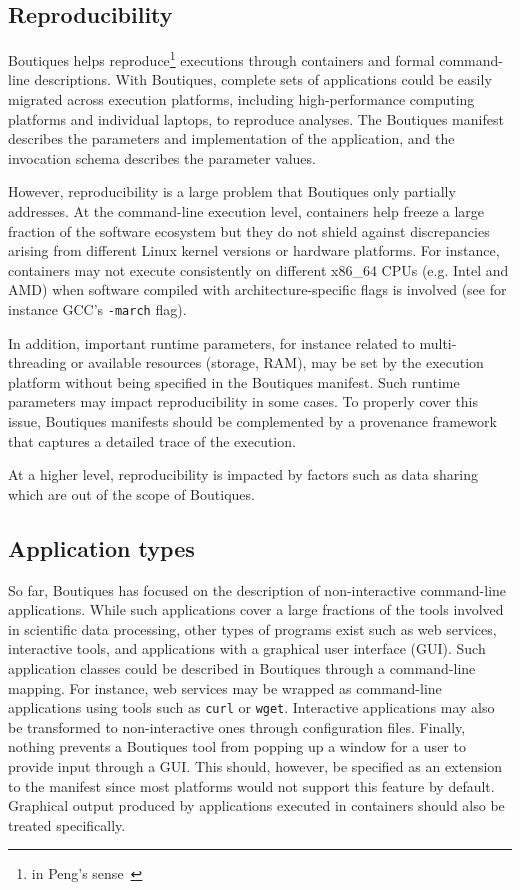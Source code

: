 \documentclass{article}
\newcommand{\boutiques}{Boutiques\xspace}
\begin{document}
\subsection{Reproducibility}

\boutiques helps reproduce\footnote{in Peng's
  sense~\cite{peng2011reproducible}} executions through containers and
formal command-line descriptions. With \boutiques, complete sets of
applications could be easily migrated across execution platforms,
including high-performance computing platforms and individual laptops,
to reproduce analyses. The \boutiques manifest describes the
parameters and implementation of the application, and the invocation
schema describes the parameter values.

However, reproducibility is a large problem that \boutiques only
partially addresses. At the command-line execution level, containers
help freeze a large fraction of the software ecosystem but they do not
shield against discrepancies arising from different Linux kernel
versions or hardware platforms. For instance, containers may not
execute consistently on different x86\_64 CPUs (e.g. Intel and AMD)
when software compiled with architecture-specific flags is involved
(see for instance GCC's \texttt{-march} flag).

In addition, important runtime parameters, for instance related to
multi-threading or available resources (storage, RAM), may be set by
the execution platform without being specified in the \boutiques
manifest. Such runtime parameters may impact reproducibility in some
cases. To properly cover this issue, \boutiques manifests should be
complemented by a provenance framework that captures a detailed trace
of the execution.

At a higher level, reproducibility is impacted by factors
such as data sharing~\cite{poldrack2014making} which are out of the
scope of \boutiques.

\subsection{Application types}

So far, \boutiques has focused on the description of non-interactive
command-line applications. While such applications cover a large
fractions of the tools involved in scientific data processing, other
types of programs exist such as web services, interactive tools, and
applications with a graphical user interface (GUI).  Such application
classes could be described in \boutiques through a command-line
mapping. For instance, web services may be wrapped as command-line
applications using tools such as \texttt{curl} or
\texttt{wget}. Interactive applications may also be transformed to
non-interactive ones through configuration files. Finally, nothing
prevents a \boutiques tool from popping up a window for a user to
provide input through a GUI. This should, however, be specified
as an extension to the manifest since most platforms would not support
this feature by default. Graphical output produced by applications
executed in containers should also be treated specifically.
\end{document}
